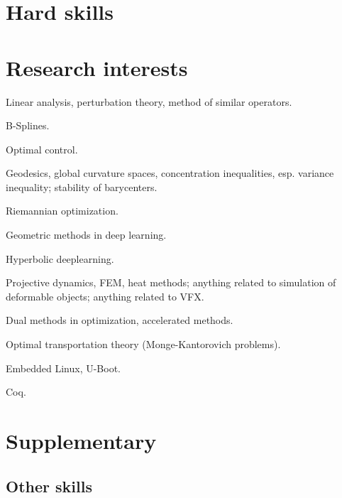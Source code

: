 \documentclass[10pt,a4paper]{moderncv}
\begin{document}
\section{Hard skills}
\begin{multicols}{2}
\end{multicols}

\section{Research interests}
\begin{itemize*}
\item{Linear analysis, perturbation theory, method of similar operators.}
\item{B-Splines.}
\item{Optimal control.}
\item{Geodesics, global curvature spaces,
    concentration inequalities, esp. variance inequality;
stability of barycenters.}
\item{Riemannian optimization.}
\item{Geometric methods in deep learning.}
\item{Hyperbolic deeplearning.}
\item{Projective dynamics, FEM, heat methods; anything related
to simulation of deformable objects;
anything related to VFX.}
\item{Dual methods in optimization, accelerated methods.}
\item{Optimal transportation theory (Monge-Kantorovich problems).}
\item{Embedded Linux, U-Boot.}
\item{Coq.}
\end{itemize*}

\newpage
\section{Supplementary}
\subsection{Other skills}
\end{document}
